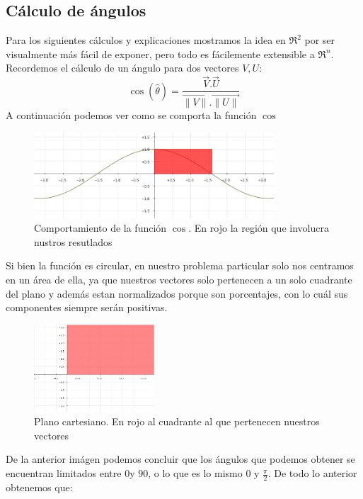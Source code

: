 \subsection{Cálculo de ángulos}
Para los siguientes cálculos y explicaciones mostramos la idea en $\Re^{2}$ por ser visualmente más fácil de exponer, pero todo es fácilemente extensible a $\Re^{n}$.\\
Recordemos el cálculo de un ángulo para dos vectores $V, U$:\\
$$\cos(\hat{\theta}) = \dfrac{\overrightarrow{V}.\overrightarrow{U}}{\overrightarrow{\lVert V\lVert}.\overrightarrow{\lVert U\lVert}}$$
A continuación podemos ver como se comporta la función $\cos$\\
\begin{figure}[H]
  \centering
    \includegraphics[width=0.8\textwidth]{img/coseno.png}
  \caption{Comportamiento de la función $\cos$. En rojo la región que involucra nustros resutlados}
  \label{bus:img-coseno}
\end{figure}
Si bien la función es circular, en nuestro problema particular solo nos centramos en un área de ella, ya que nuestros vectores solo pertenecen a un solo cuadrante del plano y además estan normalizados porque son porcentajes, con lo cuál sus componentes siempre serán positivas.\\
\begin{figure}[H]
  \centering
    \includegraphics[width=0.4\textwidth]{img/planoCartesiano.png}
  \caption{Plano cartesiano. En rojo al cuadrante al que pertenecen nuestros vectores}
  \label{bus:img-planoCartesiano}
\end{figure}
De la anterior imágen podemos concluir que los ángulos que podemos obtener se encuentran limitados entre $0$\textdegree y $90$\textdegree, o lo que es lo mismo $0$ y $\frac{\pi}{2}$. De todo lo anterior obtenemos que:
